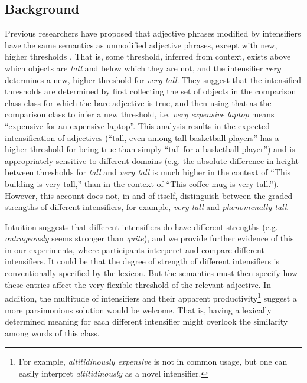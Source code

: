 \documentclass[10pt,letterpaper]{article}
\newcommand{\w}[1]{\emph{#1}}
\begin{document}
\subsection{Background}
Previous researchers have proposed that adjective phrases modified by intensifiers have the same semantics as unmodified adjective phrases, except with new, higher thresholds \cite{kennedyMcnally, klein, wheeler}. That is, some threshold, inferred from context, exists above which objects are \w{tall} and below which they are not, and the intensifier \w{very} determines a new, higher threshold for \w{very tall}.
They suggest that the intensified thresholds are determined by first collecting the set of objects in the comparison class class for which the bare adjective is true, and then using that as the comparison class to infer a new threshold, i.e. \w{very expensive laptop} means ``expensive for an expensive laptop''. This analysis results in the expected intensification of adjectives (``tall, even among tall basketball players'' has a higher threshold for being true than simply ``tall for a basketball player'') and is appropriately sensitive to different domains (e.g. the absolute difference in height between thresholds for \w{tall} and \w{very tall} is much higher in the context of ``This building is very tall,'' than in the context of ``This coffee mug is very tall.'').
However, this account does not, in and of itself, distinguish between the graded strengths of different intensifiers, for example, \w{very tall} and \w{phenomenally tall}.

Intuition suggests that different intensifiers do have different strengths (e.g. \w{outrageously} seems stronger than \w{quite}), and we provide further evidence of this in our experiments, where participants interperet and compare different intensifiers.
It could be that the degree of strength of different intensifiers is conventionally specified by the lexicon. But the semantics must then specify how these entries affect the very flexible threshold of the relevant adjective.
In addition, the multitude of intensifiers \cite{bolinger} and their apparent productivity\footnote{For example, \w{altitidinously expensive} is not in common usage, but one can easily interpret \w{altitidinously} as a novel intensifier.} suggest a more parsimonious solution would be welcome. 
That is, having a lexically determined meaning for each different intensifier might overlook the similarity among words of this class.
\end{document}
